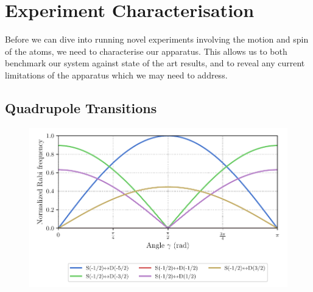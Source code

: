 \chapter{Experiment Characterisation}
\label{ch:Characterisation}
\minitoc

    Before we can dive into running novel experiments involving the motion and spin
    of the atoms, we need to characterise our apparatus. This allows us to both
    benchmark our system against state of the art results, and to reveal any
    current limitations of the apparatus which we may need to address.

\section{Quadrupole Transitions}
\label{sec:Transitions}
    \begin{figure}
        \begin{center}
        \noindent\includegraphics[width=\linewidth]{
            figures/pdf_figure/qp_transition_spectrum.pdf
            }
        \end{center}
        \caption{
            }
        \label{fig:Long Flop}
    \end{figure}


